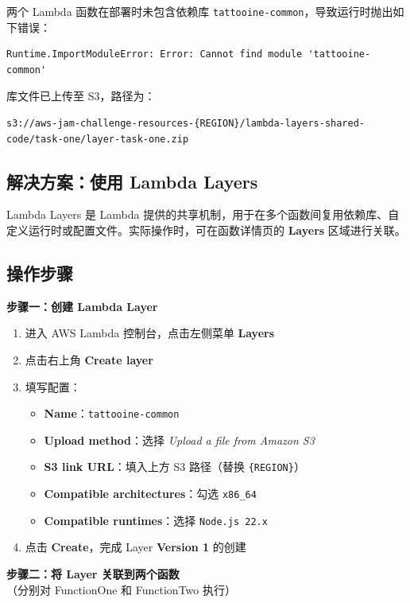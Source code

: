 \documentclass[12pt, a4paper]{article}
\begin{document}
两个 Lambda 函数在部署时未包含依赖库 \texttt{tattooine-common}，导致运行时抛出如下错误：

\begin{lstlisting}
Runtime.ImportModuleError: Error: Cannot find module 'tattooine-common'
\end{lstlisting}

库文件已上传至 S3，路径为：

\begin{lstlisting}
s3://aws-jam-challenge-resources-{REGION}/lambda-layers-shared-code/task-one/layer-task-one.zip
\end{lstlisting}

\subsection{解决方案：使用 Lambda Layers}

Lambda Layers 是 Lambda 提供的共享机制，用于在多个函数间复用依赖库、自定义运行时或配置文件。实际操作时，可在函数详情页的 \textbf{Layers} 区域进行关联。

\subsection{操作步骤}

\textbf{步骤一：创建 Lambda Layer}

\begin{enumerate}
  \item 进入 AWS Lambda 控制台，点击左侧菜单 \textbf{Layers}
  \item 点击右上角 \textbf{Create layer}
  \item 填写配置：
    \begin{itemize}
      \item \textbf{Name}：\texttt{tattooine-common}
      \item \textbf{Upload method}：选择 \textit{Upload a file from Amazon S3}
      \item \textbf{S3 link URL}：填入上方 S3 路径（替换 \texttt{\{REGION\}}）
      \item \textbf{Compatible architectures}：勾选 \texttt{x86\_64}
      \item \textbf{Compatible runtimes}：选择 \texttt{Node.js 22.x}
    \end{itemize}
  \item 点击 \textbf{Create}，完成 Layer \textbf{Version 1} 的创建
\end{enumerate}

\textbf{步骤二：将 Layer 关联到两个函数}（分别对 FunctionOne 和 FunctionTwo 执行）
\end{document}
